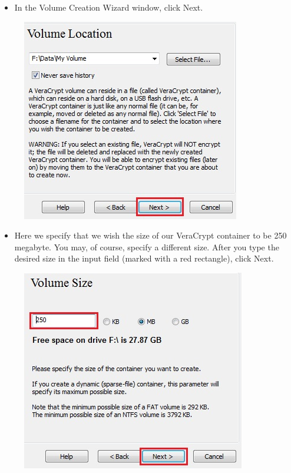 \documentclass{tufte-handout}
\begin{document}
\begin{enumerate}
\begin{figure}
	\end{figure}
	\FloatBarrier
	\begin{itemize}
		\item  In the Volume Creation Wizard window, click Next.
	\end{itemize}
	\begin{figure}%
		\includegraphics[width=\linewidth]{img/vc_install_6.png}
	\end{figure}
	\FloatBarrier
	\begin{itemize}
		\item  Here we specify that we wish the size of our VeraCrypt container to be 250 megabyte. You may, of course, specify a different size. After you type the desired size in the input field (marked with a red rectangle), click Next.
	\end{itemize}
	\begin{figure}%
		\includegraphics[width=\linewidth]{img/vc_install_7.png}

\end{figure}
\end{enumerate}
\end{document}
